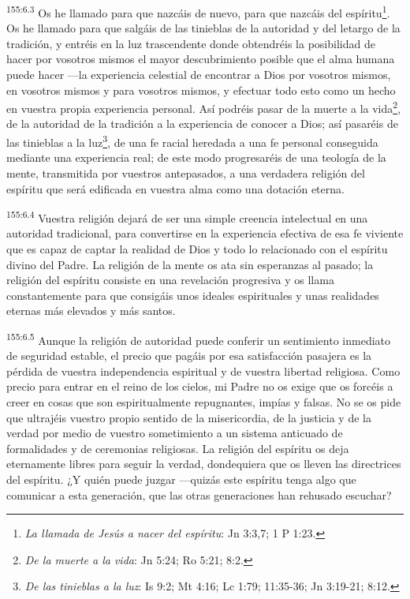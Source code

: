 \par 
\textsuperscript{155:6.3} Os he llamado para que nazcáis de nuevo, para que nazcáis del espíritu\footnote{\textit{La llamada de Jesús a nacer del espíritu}: Jn 3:3,7; 1 P 1:23.}. Os he llamado para que salgáis de las tinieblas de la autoridad y del letargo de la tradición, y entréis en la luz trascendente donde obtendréis la posibilidad de hacer por vosotros mismos el mayor descubrimiento posible que el alma humana puede hacer ---la experiencia celestial de encontrar a Dios por vosotros mismos, en vosotros mismos y para vosotros mismos, y efectuar todo esto como un hecho en vuestra propia experiencia personal. Así podréis pasar de la muerte a la vida\footnote{\textit{De la muerte a la vida}: Jn 5:24; Ro 5:21; 8:2.}, de la autoridad de la tradición a la experiencia de conocer a Dios; así pasaréis de las tinieblas a la luz\footnote{\textit{De las tinieblas a la luz}: Is 9:2; Mt 4:16; Lc 1:79; 11:35-36; Jn 3:19-21; 8:12.}, de una fe racial heredada a una fe personal conseguida mediante una experiencia real; de este modo progresaréis de una teología de la mente, transmitida por vuestros antepasados, a una verdadera religión del espíritu que será edificada en vuestra alma como una dotación eterna.

\par 
\textsuperscript{155:6.4} Vuestra religión dejará de ser una simple creencia intelectual en una autoridad tradicional, para convertirse en la experiencia efectiva de esa fe viviente que es capaz de captar la realidad de Dios y todo lo relacionado con el espíritu divino del Padre. La religión de la mente os ata sin esperanzas al pasado; la religión del espíritu consiste en una revelación progresiva y os llama constantemente para que consigáis unos ideales espirituales y unas realidades eternas más elevados y más santos.

\par 
\textsuperscript{155:6.5} Aunque la religión de autoridad puede conferir un sentimiento inmediato de seguridad estable, el precio que pagáis por esa satisfacción pasajera es la pérdida de vuestra independencia espiritual y de vuestra libertad religiosa. Como precio para entrar en el reino de los cielos, mi Padre no os exige que os forcéis a creer en cosas que son espiritualmente repugnantes, impías y falsas. No se os pide que ultrajéis vuestro propio sentido de la misericordia, de la justicia y de la verdad por medio de vuestro sometimiento a un sistema anticuado de formalidades y de ceremonias religiosas. La religión del espíritu os deja eternamente libres para seguir la verdad, dondequiera que os lleven las directrices del espíritu. ¿Y quién puede juzgar ---quizás este espíritu tenga algo que comunicar a esta generación, que las otras generaciones han rehusado escuchar?

